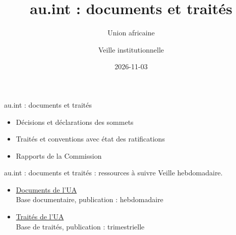 \documentclass[aspectratio=169,11pt]{beamer}
\title{au.int : documents et traités}
\subtitle{Union africaine}
\author{Veille institutionnelle}
\date{2026-11-03}
\begin{document}
\begin{frame}\titlepage\end{frame}

\begin{frame}{au.int : documents et traités}
\begin{itemize}
\item Décisions et déclarations des sommets
\item Traités et conventions avec état des ratifications
\item Rapports de la Commission
\end{itemize}
\end{frame}

\begin{frame}{au.int : documents et traités : ressources à suivre}
\small
Veille hebdomadaire.
\begin{itemize}
\item \href{https://au.int/en/documents}{Documents de l'UA}\\{\footnotesize Base documentaire, publication : hebdomadaire}
\item \href{https://au.int/en/treaties}{Traités de l'UA}\\{\footnotesize Base de traités, publication : trimestrielle}
\end{itemize}
\end{frame}
\end{document}
